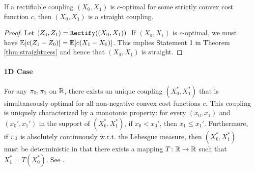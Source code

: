\begin{thm}\label{thm:straightOpt}
If a rectifiable  coupling $(X_0,X_1)$ 
is $c$-optimal for some strictly convex cost function $c$, then $(X_0,X_1)$ is a straight coupling. 
\end{thm}
\begin{proof}
Let $(Z_0,Z_1) = \mathtt{Rectify}((X_0,X_1))$. 
If $(X_0,X_1)$ is $c$-optimal, we must have $\mathbb{E}[c(Z_1-Z_0)] = \mathbb{E}[c(X_1-X_0)]$. 
This implies Statement 1 in Theorem \ref{thm:straightness} and hence that $(X_0,X_1)$ is straight. 
\end{proof}


\paragraph{1D Case}  
For any ${\pi}_0,{\pi}_1$ on $\mathbb{R}$, there exists an unique coupling $(X_0^*,X_1^*)$
that is simultaneously optimal for all non-negative convex cost functions $c$. This coupling is uniquely characterized by a monotonic property: for every $(x_0,x_1)$ and $(x_0',x_1')$  in the support of $(X_0^*, X_1^*)$, 
if  $x_0< x_0'$, then $x_1 \leq x_1'$. 
Furthermore, if ${\pi}_0$ is absolutely continuously w.r.t. the Lebesgue measure, 
then $(X_0^*, X_1^*)$ must be deterministic in that there exists a mapping $T\colon \mathbb{R}\to\mathbb{R}$ such that $X_1^* = T(X_0^*)$. 
See \cite{santambrogio2015optimal}.   

